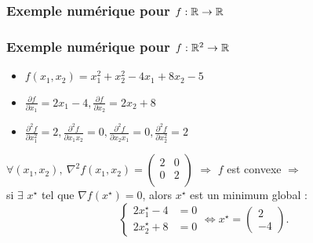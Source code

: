 \documentclass{beamer}
\newcommand{\R}{{\ensuremath\mathbb{R}}}
\begin{document}
\begin{frame}
  \frametitle{Exemple numérique pour $f:\R \rightarrow \R$}

  
\end{frame}

\begin{frame}
  \frametitle{Exemple numérique pour $f:\R^2 \rightarrow \R$}

  \begin{itemize}
  \item $f(x_1,x_2) = x_1^2 + x_2^2 - 4x_1 + 8x_2 - 5$
  \item $\frac{\partial f}{\partial x_1} = 2x_1 - 4, \frac{\partial f}{\partial x_2} = 2x_2 + 8$
  \item $
    \frac{\partial^2 f}{\partial x_1^2} = 2,
    \frac{\partial^2 f}{\partial x_1x_2} = 0,
    \frac{\partial^2 f}{\partial x_2x_1} = 0,
    \frac{\partial^2 f}{\partial x_2^2} = 2
    $
  \end{itemize}

  
  $\forall (x_1,x_2), \ \nabla^2f(x_1,x_2) =
  \left(\begin{array}{cc}
    2 & 0 \\
    0 & 2 \\
  \end{array}
  \right)
  $ $\Rightarrow$ $f$ est convexe $\Rightarrow$ \\
  si $\exists$ $x^\star$ tel que ${\nabla f}(x^\star) = 0$,
  alors $x^\star$ est un minimum global : 
  \[
  \left\{
  \begin{array}{ll}
    2x^\star_1 - 4 & = 0\\
    2x^\star_2 + 8 & = 0
  \end{array}
  \right.
  \Leftrightarrow x^\star = 
  \begin{pmatrix}
   2 \\
   -4 
  \end{pmatrix}.
  \]
  
\end{frame}
\end{document}
